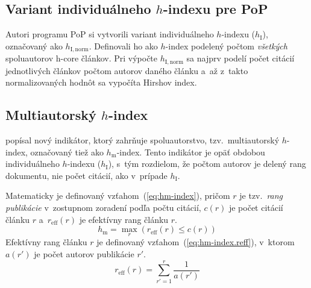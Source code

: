\subsection{Variant individuálneho $h$-indexu pre PoP}
\label{sec:hinorm}

Autori programu PoP si vytvorili variant individuálneho
$h$-indexu ($h_{\mathrm{I}}$), označovaný ako $h_{\mathrm{I, norm}}$.
Definovali ho ako $h$-index podelený počtom \emph{všetkých} spoluautorov h-core
článkov.  Pri výpočte $h_{\mathrm{I, norm}}$ sa najprv podelí počet citácií
jednotlivých článkov počtom autorov daného článku a~až z~takto normalizovaných
hodnôt sa vypočíta Hirshov index.


\subsection{Multiautorský $h$-index}
\label{sec:hm-index}

\citet{Schreiber2008} popísal nový indikátor, ktorý zahrňuje spoluautorstvo,
tzv.~multiautorský $h$-index, označovaný tiež ako $h_{\mathrm{m}}$-index.  Tento
indikátor je opäť obdobou individuálneho $h$-indexu ($h_{\mathrm{I}}$), s~tým
rozdielom, že počtom autorov je delený rang dokumentu, nie počet citácií,
ako v~prípade $h_{\mathrm{I}}$.

Matematicky je definovaný vzťahom~(\ref{eq:hm-index}), pričom $r$ je
tzv.~\emph{rang publikácie} v~zostupnom zoradení podľa počtu citácií, $c(r)$ je
počet citácií článku $r$ a~$r_{\mathrm{eff}}(r)$ je efektívny rang článku $r$.
\begin{equation}
\label{eq:hm-index}
h_{\mathrm{m}} = \max_r{(r_{\mathrm{eff}}(r) \leq c(r))}
\end{equation}
Efektívny rang článku $r$ je definovaný vzťahom~(\ref{eq:hm-index.reff}), v~ktorom
$a(r')$ je počet autorov publikácie $r'$.
\begin{equation}
\label{eq:hm-index.reff}
r_{\mathrm{eff}}(r) = \sum_{r'=1}^r{\frac{1}{a(r')}}
\end{equation}


